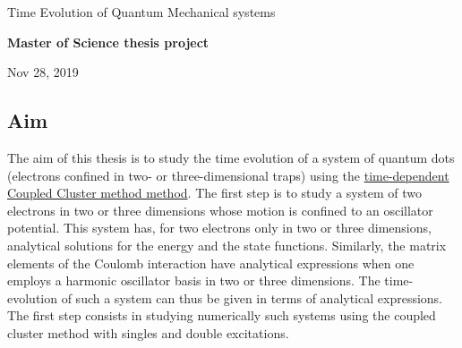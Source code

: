 \documentclass[%
oneside,                 %
final,                   %
10pt]{article}
\begin{document}

\newcommand{\exercisesection}[1]{\subsection*{#1}}






\thispagestyle{empty}

\begin{center}
{\LARGE\bf
\begin{spacing}{1.25}
Time Evolution of Quantum Mechanical systems
\end{spacing}
}
\end{center}


\begin{center}
{\bf Master of Science thesis project${}^{}$} \\ [0mm]
\end{center}

\begin{center}
\end{center}
    

\begin{center}
Nov 28, 2019
\end{center}

\vspace{1cm}


\subsection*{Aim}

The aim of this thesis is to study the time evolution of a system of
quantum dots (electrons confined in two- or three-dimensional traps) using the
\href{{https://github.com/haakoek/PythonVersionMaster/tree/master/Thesis/Chapters}}{time-dependent Coupled Cluster method
method}. The
first step is to study a system of two electrons in two or three
dimensions whose motion is confined to an oscillator potential. This
system has, for two electrons only in two or three dimensions,
analytical solutions for the energy and the state
functions. Similarly, the matrix elements of the Coulomb interaction
have analytical expressions when one employs a harmonic oscillator
basis in two or three dimensions. The time-evolution of such a system
can thus be given in terms of analytical expressions. The first step
consists in studying numerically such systems using the coupled
cluster method with singles and double excitations.  
\end{document}
